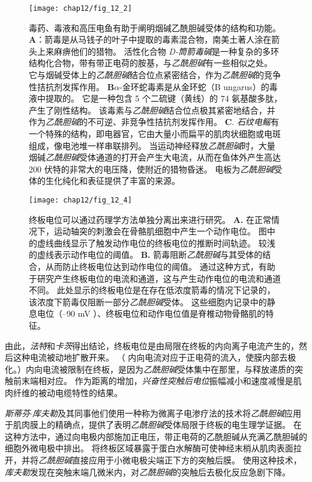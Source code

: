 \begin{figure}[htbp]
	\centering
	\texttt{[image: chap12/fig\_12\_2]}
	\caption{毒药、毒液和高压电鱼有助于阐明烟碱乙酰胆碱受体的结构和功能。 
	\textbf{A}：箭毒是从马钱子的叶子中提取的毒素混合物，南美土著人涂在箭头上来麻痹他们的猎物。
	活性化合物 \textit{D-筒箭毒碱}是一种复杂的多环结构化合物，带有带正电荷的胺基，与\textit{乙酰胆碱}有一些相似之处。
	它与烟碱受体上的\textit{乙酰胆碱}结合位点紧密结合，作为\textit{乙酰胆碱}的竞争性拮抗剂发挥作用。
	\textbf{B}$\alpha$-金环蛇毒素是从金环蛇（B ungarus）的毒液中提取的。
	它是一种包含 5 个二硫键（黄线）的 74 氨基酸多肽，产生了刚性结构。
	该毒素与\textit{乙酰胆碱}结合位点极其紧密地结合，并作为\textit{乙酰胆碱}的不可逆、非竞争性拮抗剂发挥作用。
	\textbf{C}. \textit{石纹电鳐}有一个特殊的结构，即电器官，它由大量小而扁平的肌肉状细胞或电斑组成，像电池堆一样串联排列。
	当运动神经释放\textit{乙酰胆碱}时，大量烟碱\textit{乙酰胆碱}受体通道的打开会产生大电流，从而在鱼体外产生高达 200 伏特的非常大的电压降，使附近的猎物昏迷。
	电板为\textit{乙酰胆碱}受体的生化纯化和表征提供了丰富的来源。}
	\label{fig:12_2}
\end{figure}


\begin{figure}[htbp]
	\centering
	\texttt{[image: chap12/fig\_12\_4]}
	\caption{终板电位可以通过药理学方法单独分离出来进行研究。
		\textbf{A.} 在正常情况下，运动轴突的刺激会在骨骼肌细胞中产生一个动作电位。
		图中的虚线曲线显示了触发动作电位的终板电位的推断时间轨迹。
		较浅的虚线表示动作电位的阈值。
		\textbf{B.} 箭毒阻断\textit{乙酰胆碱}与其受体的结合，从而防止终板电位达到动作电位的阈值。
		通过这种方式，有助于研究产生终板电位的电流和通道，这与产生动作电位的电流和通道不同。
		此处显示的终板电位是在存在低浓度箭毒的情况下记录的，该浓度下箭毒仅阻断一部分\textit{乙酰胆碱}受体。
		这些细胞内记录中的静息电位（–90  mV ）、终板电位和动作电位值是脊椎动物骨骼肌的特征。}
	\label{fig:12_4}
\end{figure}


由此，\textit{法特}和\textit{卡茨}得出结论，终板电位是由局限在终板的内向离子电流产生的，然后这种电流被动地扩散开来。
（ 内向电流对应于正电荷的流入，使膜内部去极化。）内向电流被限制在终板，是因为\textit{乙酰胆碱}受体集中在那里，与释放递质的突触前末端相对应。
作为距离的增加，\textit{兴奋性突触后电位}振幅减小和速度减慢是肌肉纤维的被动电缆特性的结果。


\textit{斯蒂芬$\cdot$库夫勒}及其同事他们使用一种称为微离子电渗疗法的技术将\textit{乙酰胆碱}应用于肌肉膜上的精确点，提供了表明\textit{乙酰胆碱}受体局限于终板的电生理学证据。
在这种方法中，通过向电极内部施加正电压，带正电荷的乙酰胆碱从充满乙酰胆碱的细胞外微电极中排出。
将终板区域暴露于蛋白水解酶可使神经末梢从肌肉表面拉开，并将\textit{乙酰胆碱}直接应用于小微电极尖端正下方的突触后膜。
使用这种技术，\textit{库夫勒}发现在突触末端几微米内，对\textit{乙酰胆碱}的突触后去极化反应急剧下降。


